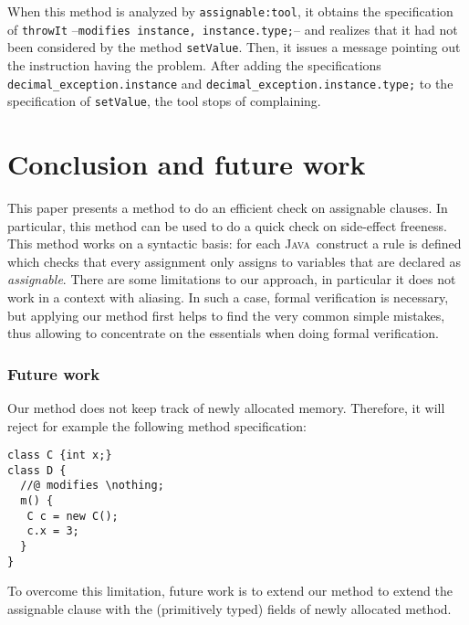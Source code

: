 \documentclass[a4paper]{llncs}
\newcommand{\java}{\textsc{Java}}
\newcommand{\modtool}{\texttt{assignable:tool}}
\newcommand{\nothing}{\texttt{\(\backslash\)nothing}}
\begin{document}
When this method is analyzed by \modtool, it obtains the specification 
of \texttt{throwIt} --\texttt{modifies instance, instance.type;}-- and 
realizes that it had not been considered by the method
\texttt{setValue}. Then, it issues a message pointing out the instruction
having the problem. After adding the specifications
\texttt{decimal\_exception.instance} and
\texttt{decimal\_exception.instance.type;} to the specification of
\texttt{setValue}, the tool stops of complaining.  


    


\section{Conclusion and future work}
\label{sec-con-and-fut-wor}
This paper presents a method to do an efficient check on assignable
clauses. In particular, this method can be used to do a quick check on 
side-effect freeness.
This method works on a syntactic basis: 
for each \java\ construct a rule is defined which checks that every
assignment only assigns to variables that are declared as 
\emph{assignable}. There are some limitations to our approach, in
particular it does not work in a context with aliasing. In such a
case, formal verification is necessary, but applying our method first
helps to find the very common simple mistakes, thus allowing to
concentrate on the essentials when doing formal verification.


\subsubsection{Future work}
Our method does not keep track of newly allocated memory. Therefore,
it will reject for example the following method specification:
\begin{verbatim}
class C {int x;}
class D {
  //@ modifies \nothing;
  m() {
   C c = new C();
   c.x = 3;
  }
}
\end{verbatim}
To overcome this limitation, future work is to extend our method to extend the
assignable clause with the (primitively typed) fields of newly
allocated method.
\end{document}
